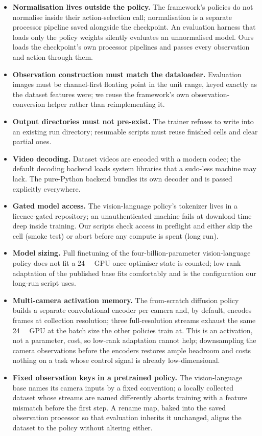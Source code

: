 \begin{itemize}
  \item \textbf{Normalisation lives outside the policy.} The framework's
    policies do not normalise inside their action-selection call;
    normalisation is a separate processor pipeline saved alongside the
    checkpoint. An evaluation harness that loads only the policy weights
    silently evaluates an unnormalised model. Ours loads the
    checkpoint's own processor pipelines and passes every observation
    and action through them.
  \item \textbf{Observation construction must match the dataloader.}
    Evaluation images must be channel-first floating point in the unit
    range, keyed exactly as the dataset features were; we reuse the
    framework's own observation-conversion helper rather than
    reimplementing it.
  \item \textbf{Output directories must not pre-exist.} The trainer
    refuses to write into an existing run directory; resumable scripts
    must reuse finished cells and clear partial ones.
  \item \textbf{Video decoding.} Dataset videos are encoded with a
    modern codec; the default decoding backend loads system libraries
    that a sudo-less machine may lack. The pure-Python backend bundles
    its own decoder and is passed explicitly everywhere.
  \item \textbf{Gated model access.} The vision-language policy's
    tokenizer lives in a licence-gated repository; an unauthenticated
    machine fails at download time deep inside training. Our scripts
    check access in preflight and either skip the cell (smoke test) or
    abort before any compute is spent (long run).
  \item \textbf{Model sizing.} Full finetuning of the
    four-billion-parameter vision-language policy does not fit a
    \SI{24}{\gibi\byte} GPU once optimiser state is counted; low-rank
    adaptation of the published base fits comfortably and is the
    configuration our long-run script uses.
  \item \textbf{Multi-camera activation memory.} The from-scratch
    diffusion policy builds a separate convolutional encoder per camera
    and, by default, encodes frames at collection resolution; three
    full-resolution streams exhaust the same \SI{24}{\gibi\byte} GPU at
    the batch size the other policies train at. This is an activation, not
    a parameter, cost, so low-rank adaptation cannot help; downsampling
    the camera observations before the encoders restores ample headroom
    and costs nothing on a task whose control signal is already
    low-dimensional.
  \item \textbf{Fixed observation keys in a pretrained policy.} The
    vision-language base names its camera inputs by a fixed convention; a
    locally collected dataset whose streams are named differently aborts
    training with a feature mismatch before the first step. A rename map,
    baked into the saved observation processor so that evaluation inherits
    it unchanged, aligns the dataset to the policy without altering
    either.
\end{itemize}

